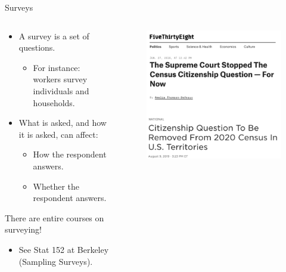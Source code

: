 \documentclass[aspectratio=169]{../latex_main/tntbeamer}  %
\begin{document}
	\begin{frame}{Surveys}
	    \begin{columns}
	         \begin{column}{.4\textwidth}
	         \begin{itemize}
	             \item A survey is a set of questions.
	             \begin{itemize}
	                 \item For instance: workers survey individuals and households.
	             \end{itemize}
	             \item What is asked, and how it is asked, can affect:
	             \begin{itemize}
	                 \item How the respondent answers.
	                 \item Whether the respondent answers.
	             \end{itemize}
	         \end{itemize}
	         There are entire courses on surveying!
            \begin{itemize}
                \item See Stat 152 at Berkeley (Sampling Surveys).
            \end{itemize}

	         \end{column}
	         \begin{column}{.4\textwidth}
	                \begin{figure}
	                    \centering
	                    \includegraphics[scale=.35]{Bild7}
	                \end{figure}
	                

	         \end{column}
	     \end{columns}
	\end{frame}
	
\end{document}
